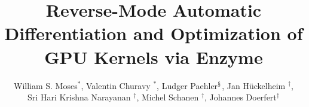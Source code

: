 \documentclass[sigconf]{acmart}
\begin{document}
\title{Reverse-Mode Automatic Differentiation and Optimization of GPU Kernels via Enzyme}
\author{William S. Moses$^*$,\hspace{1em} Valentin Churavy $^*$,\hspace{1em} Ludger Paehler$^{\mathsection}$,\hspace{1em} Jan Hückelheim $^\dagger$,\\ Sri Hari Krishna Narayanan  $^\dagger$,\hspace{1em} Michel Schanen  $^\dagger$,\hspace{1em} Johannes Doerfert$^\dagger$}

\renewcommand{\shortauthors}{Moses, Churavy, Paehler, Hückelheim, Narayanan, Schanen, and Doerfert}
\end{document}
